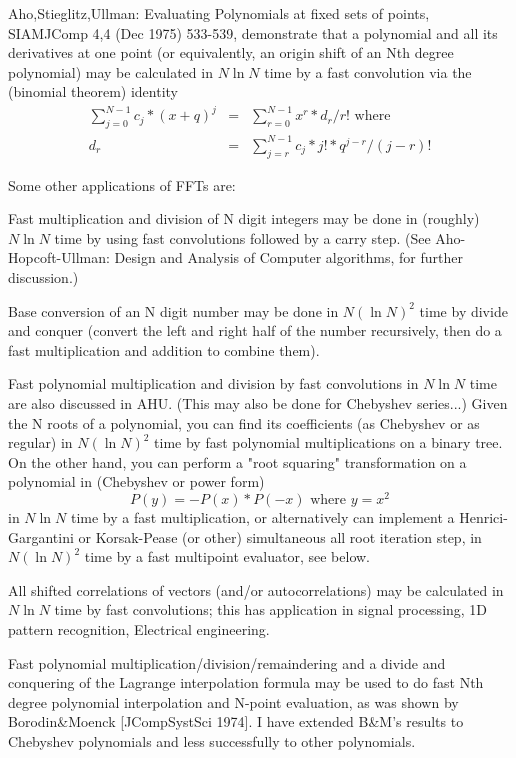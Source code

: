 Aho,Stieglitz,Ullman: Evaluating Polynomials at fixed sets of points,
SIAMJComp 4,4 (Dec 1975) 533-539, demonstrate that a polynomial and all its
derivatives at one point (or equivalently, an origin shift of an Nth
degree polynomial) may be calculated in $N\ln N$ time by a fast convolution
via the (binomial theorem) identity
\begin{eqnarray}
    \sum_{j=0}^{N-1} c_j*(x+q)^j  & = & \sum_{r=0}^{N-1} x^r * d_r/r!
  \mbox {  where}\\
    d_r & = & \sum_{j=r}^{N-1} c_j*j! * q^{j-r}/(j-r)!
\end{eqnarray}

Some other applications of FFTs are:

Fast multiplication and division of N digit integers may be done in
(roughly) $N\ln N$ time by using fast convolutions followed by a carry step.
(See Aho-Hopcoft-Ullman: Design and Analysis of Computer algorithms, for
further discussion.)

Base conversion of an N digit number may be done in $N(\ln N)^2$ time by
divide and conquer (convert the left and right half of the number recursively,
then do a fast multiplication and addition to combine them).

Fast polynomial multiplication and division by fast convolutions in $N\ln N$
time are also discussed in AHU. (This may also be done for Chebyshev
series...) Given the N roots of a polynomial, you can find its
coefficients (as Chebyshev or as regular) in $N(\ln N)^2$ time by fast
polynomial multiplications on a binary tree. On the other hand,
you can perform a "root squaring" transformation on a polynomial
in (Chebyshev or power form)
\begin{equation}
   P(y) = -P(x)*P(-x)  \mbox{ where }y = x^2
\end{equation}
in $N\ln N$ time by a fast multiplication, or alternatively can implement
a Henrici-Gargantini or Korsak-Pease (or other) simultaneous all root iteration
step, in $N(\ln N)^2$ time by a fast multipoint evaluator, see below.

All shifted correlations of vectors (and/or autocorrelations) may be
calculated in $N\ln N$ time by fast convolutions; this has application in
signal processing, 1D pattern recognition, Electrical engineering.

Fast polynomial multiplication/division/remaindering and a divide and
conquering of the Lagrange interpolation formula may be used to do fast
Nth degree polynomial interpolation and N-point evaluation, as was
shown by Borodin\&Moenck [JCompSystSci 1974]. I have extended B\&M's
results to Chebyshev polynomials and less successfully to other
polynomials.

